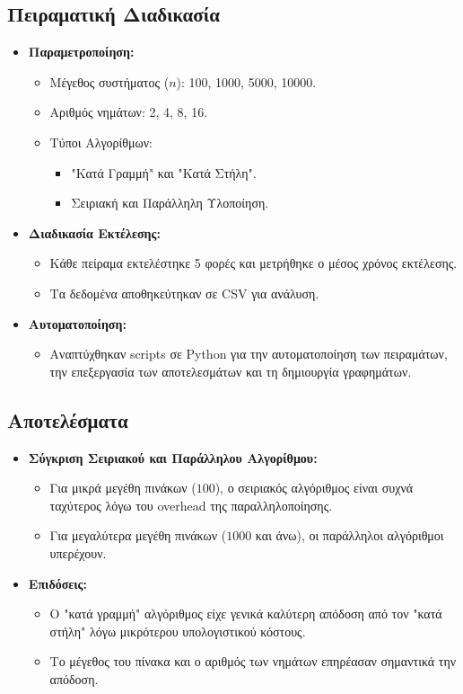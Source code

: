 \documentclass{article}
\begin{document}
\subsection*{Πειραματική Διαδικασία}
\begin{itemize}
    \item \textbf{Παραμετροποίηση:}
    \begin{itemize}
        \item Μέγεθος συστήματος ($n$): 100, 1000, 5000, 10000.
        \item Αριθμός νημάτων: 2, 4, 8, 16.
        \item Τύποι Αλγορίθμων:
        \begin{itemize}
            \item "Κατά Γραμμή" και "Κατά Στήλη".
            \item Σειριακή και Παράλληλη Υλοποίηση.
        \end{itemize}
    \end{itemize}
    \item \textbf{Διαδικασία Εκτέλεσης:}
    \begin{itemize}
        \item Κάθε πείραμα εκτελέστηκε 5 φορές και μετρήθηκε ο μέσος χρόνος εκτέλεσης.
        \item Τα δεδομένα αποθηκεύτηκαν σε CSV για ανάλυση.
    \end{itemize}
    \item \textbf{Αυτοματοποίηση:}
    \begin{itemize}
        \item Αναπτύχθηκαν scripts σε Python για την αυτοματοποίηση των πειραμάτων, την επεξεργασία των αποτελεσμάτων και τη δημιουργία γραφημάτων.
    \end{itemize}
\end{itemize}
\subsection*{Αποτελέσματα}
\begin{itemize}
    \item \textbf{Σύγκριση Σειριακού και Παράλληλου Αλγορίθμου:}
    \begin{itemize}
        \item Για μικρά μεγέθη πινάκων ($100$), ο σειριακός αλγόριθμος είναι συχνά ταχύτερος λόγω του overhead της παραλληλοποίησης.
        \item Για μεγαλύτερα μεγέθη πινάκων ($1000$ και άνω), οι παράλληλοι αλγόριθμοι υπερέχουν.
    \end{itemize}
    \item \textbf{Επιδόσεις:}
    \begin{itemize}
        \item Ο "κατά γραμμή" αλγόριθμος είχε γενικά καλύτερη απόδοση από τον "κατά στήλη" λόγω μικρότερου υπολογιστικού κόστους.
        \item Το μέγεθος του πίνακα και ο αριθμός των νημάτων επηρέασαν σημαντικά την απόδοση.
    \end{itemize}
 \end{itemize}
\end{document}
